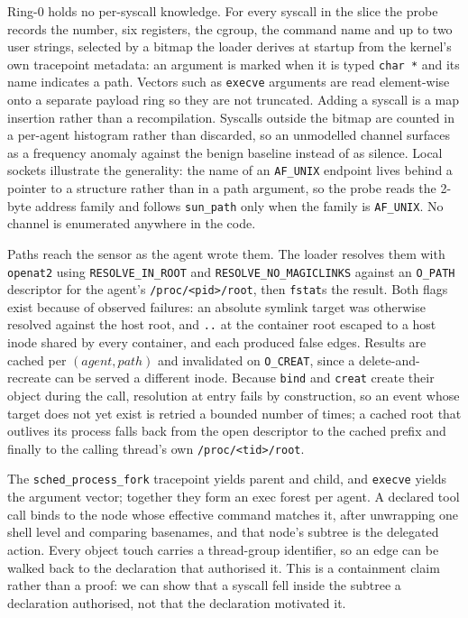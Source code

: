 \1\noindent Ring-0 holds no per-syscall knowledge. For every syscall in
the slice the probe records the number, six registers, the cgroup, the command
name and up to two user strings, selected by a bitmap the loader derives at
startup from the kernel's own tracepoint metadata: an argument is marked when it
is typed \texttt{char~*} and its name indicates a path. Vectors such as
\texttt{execve} arguments are read element-wise onto a separate payload ring so
they are not truncated. Adding a syscall is a map insertion rather than a
recompilation. Syscalls outside the bitmap are counted in a per-agent histogram
rather than discarded, so an unmodelled channel surfaces as a frequency anomaly
against the benign baseline instead of as silence. Local sockets illustrate the
generality: the name of an \texttt{AF\_UNIX} endpoint lives behind a pointer to
a structure rather than in a path argument, so the probe reads the 2-byte address
family and follows \texttt{sun\_path} only when the family is \texttt{AF\_UNIX}.
No channel is enumerated anywhere in the code.

\1\noindent Paths reach the sensor as the agent wrote them. The loader
resolves them with \texttt{openat2} using \texttt{RESOLVE\_IN\_ROOT} and
\texttt{RESOLVE\_NO\_MAGICLINKS} against an \texttt{O\_PATH} descriptor for the
agent's \texttt{/proc/<pid>/root}, then \texttt{fstat}s the result. Both flags
exist because of observed failures: an absolute symlink target was otherwise
resolved against the host root, and \texttt{..} at the container root escaped to a
host inode shared by every container, and each produced false edges. Results are
cached per $(\mathit{agent},\mathit{path})$ and invalidated on \texttt{O\_CREAT},
since a delete-and-recreate can be served a different inode. Because \texttt{bind}
and \texttt{creat} create their object during the call, resolution at entry fails
by construction, so an event whose target does not yet exist is retried a bounded
number of times; a cached root that outlives its process falls back from the open
descriptor to the cached prefix and finally to the calling thread's own
\texttt{/proc/<tid>/root}.

\1\noindent The \texttt{sched\_process\_fork} tracepoint yields parent
and child, and \texttt{execve} yields the argument vector; together they form an
exec forest per agent. A declared tool call binds to the node whose effective
command matches it, after unwrapping one shell level and comparing basenames, and
that node's subtree is the delegated action. Every object touch carries a
thread-group identifier, so an edge can be walked back to the declaration that
authorised it. This is a containment claim rather than a proof: we can show that a
syscall fell inside the subtree a declaration authorised, not that the declaration
motivated it.

